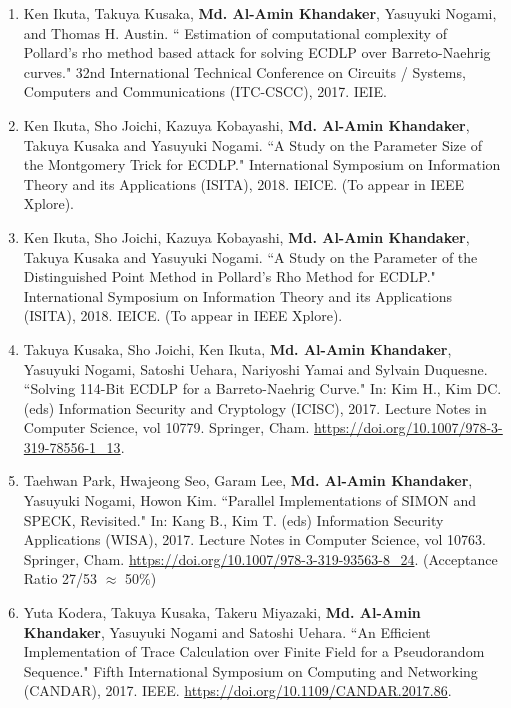 \begin{itemize}
\begin{enumerate}
	\item Ken Ikuta, Takuya Kusaka, \textbf{Md. Al-Amin Khandaker}, Yasuyuki Nogami, and Thomas H. Austin. `` Estimation of computational complexity of Pollard's rho method based attack for solving ECDLP over Barreto-Naehrig curves." 32nd International Technical Conference on Circuits / Systems, Computers and Communications (ITC-CSCC), 2017. IEIE. 
	
	\item Ken Ikuta, Sho Joichi, Kazuya Kobayashi, \textbf{Md. Al-Amin Khandaker}, Takuya Kusaka and Yasuyuki Nogami. ``A Study on the Parameter Size of the Montgomery Trick for ECDLP." International Symposium on Information Theory and its Applications (ISITA), 2018. IEICE. (To appear in IEEE Xplore).
	
	\item Ken Ikuta, Sho Joichi, Kazuya Kobayashi, \textbf{Md. Al-Amin Khandaker}, Takuya Kusaka and Yasuyuki Nogami. ``A Study on the Parameter of the Distinguished Point Method in Pollard's Rho Method for ECDLP." International Symposium on Information Theory and its Applications (ISITA), 2018. IEICE. (To appear in IEEE Xplore).
	
	\item Takuya Kusaka, Sho Joichi, Ken Ikuta, \textbf{Md. Al-Amin Khandaker}, Yasuyuki Nogami, Satoshi Uehara, Nariyoshi Yamai and Sylvain Duquesne. ``Solving 114-Bit ECDLP for a Barreto-Naehrig Curve." In: Kim H., Kim DC. (eds) Information Security and Cryptology (ICISC),  2017. Lecture Notes in Computer Science, vol 10779. Springer, Cham. \url{https://doi.org/10.1007/978-3-319-78556-1_13}.
	
	\item Taehwan Park, Hwajeong Seo, Garam Lee, \textbf{Md. Al-Amin Khandaker}, Yasuyuki Nogami, Howon Kim. ``Parallel Implementations of SIMON and SPECK, Revisited." In: Kang B., Kim T. (eds) Information Security Applications (WISA), 2017. Lecture Notes in Computer Science, vol 10763. Springer, Cham. \url{https://doi.org/10.1007/978-3-319-93563-8_24}. (Acceptance Ratio 27/53 $\approx$ 50\%)
	
	\item	Yuta Kodera, Takuya Kusaka, Takeru Miyazaki, \textbf{Md. Al-Amin Khandaker}, Yasuyuki Nogami and  Satoshi Uehara. ``An Efficient Implementation of Trace Calculation over Finite Field for a Pseudorandom Sequence." Fifth International Symposium on Computing and Networking (CANDAR), 2017. IEEE. \url{https://doi.org/10.1109/CANDAR.2017.86}.
	

\end{enumerate}
\end{itemize}
